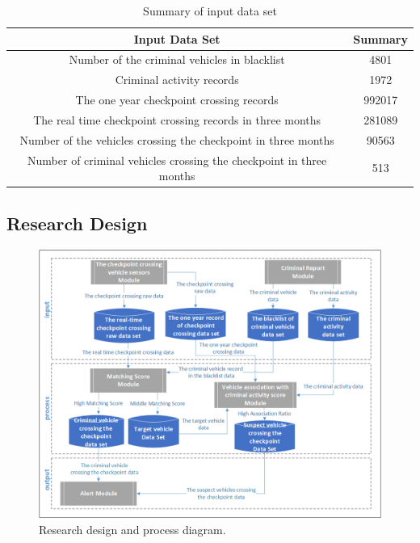 \begin{table}[!t]
\renewcommand{\arraystretch}{1.2}
\caption{Summary of input data set}
\label{table_inputData}
\centering
\begin{tabular}{c|c}
\hline
\bfseries Input Data Set & \bfseries Summary\\
\hline
Number of the criminal vehicles in blacklist & 4801\\
\hline
Criminal activity records & 1972\\
\hline
The one year checkpoint crossing records & 992017\\
\hline
The real time checkpoint crossing records in three months & 281089\\
\hline
Number of the vehicles crossing the checkpoint in three months& 90563\\
\hline
Number of criminal vehicles crossing the checkpoint in three months& 513\\
\hline
\end{tabular}
\end{table}

\subsection{Research Design}
\label{sec:7}

\begin{figure}
\centering
\includegraphics[width=1\textwidth]{images/myfigure.jpg}
\caption{Research design and process diagram.}
\label{fig:diagram}
\end{figure}

